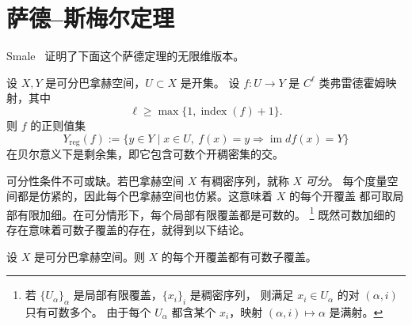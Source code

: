 
\section{萨德--斯梅尔定理}\label{sec:A-5}

Smale~ 证明了下面这个萨德定理的无限维版本。

\begin{theorem}[萨德--斯梅尔]\label{thm:A-5-1}
设 $X,Y$ 是可分巴拿赫空间，$U\subset X$ 是开集。
设 $f:U\to Y$ 是 $C^\ell$ 类弗雷德霍姆映射，其中
\[
  \ell\ge\max\{1,\operatorname{index}(f)+1\}.
\]
则 $f$ 的正则值集
\[
  Y_{\mathrm{reg}}(f):=
  \bigl\{y\in Y\mid x\in U,\ f(x)=y
  \Longrightarrow\operatorname{im}df(x)=Y\bigr\}
\]
在贝尔意义下是剩余集，即它包含可数个开稠密集的交。
\end{theorem}

可分性条件不可或缺。若巴拿赫空间 $X$ 有稠密序列，就称 $X$ \emph{可分}。
每个度量空间都是仿紧的，因此每个巴拿赫空间也仿紧。这意味着 $X$ 的每个开覆盖
都可取局部有限加细。在可分情形下，每个局部有限覆盖都是可数的。
\footnote{若 $\{U_\alpha\}_\alpha$ 是局部有限覆盖，$\{x_i\}_i$ 是稠密序列，
则满足 $x_i\in U_\alpha$ 的对 $(\alpha,i)$ 只有可数多个。
由于每个 $U_\alpha$ 都含某个 $x_i$，映射 $(\alpha,i)\mapsto\alpha$ 是满射。}
既然可数加细的存在意味着可数子覆盖的存在，就得到以下结论。

\begin{proposition}\label{prop:A-5-2}
设 $X$ 是可分巴拿赫空间。则 $X$ 的每个开覆盖都有可数子覆盖。
\end{proposition}

